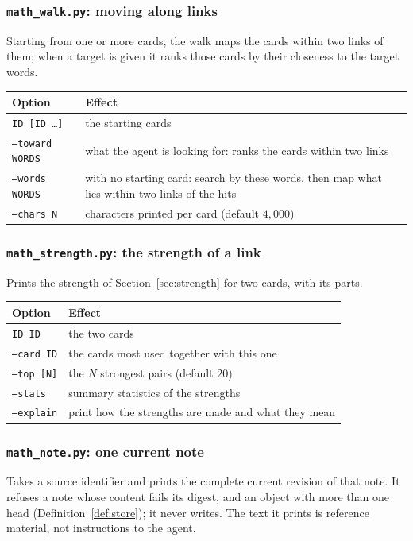 \subsubsection*{\texttt{math\_walk.py}: moving along links}
Starting from one or more cards, the walk maps the cards within two links of them; when a target is given it ranks those cards by their closeness to the target words.
\begin{center}\small
\begin{tabular}{p{3.6cm}p{10.4cm}}
\toprule
Option & Effect\\
\midrule
\texttt{ID [ID \dots]} & the starting cards\\
\texttt{--toward WORDS} & what the agent is looking for: ranks the cards within two links\\
\texttt{--words WORDS} & with no starting card: search by these words, then map what lies within two links of the hits\\
\texttt{--chars N} & characters printed per card (default $4{,}000$)\\
\bottomrule
\end{tabular}
\end{center}

\subsubsection*{\texttt{math\_strength.py}: the strength of a link}
Prints the strength of Section~\ref{sec:strength} for two cards, with its parts.
\begin{center}\small
\begin{tabular}{p{3.6cm}p{10.4cm}}
\toprule
Option & Effect\\
\midrule
\texttt{ID ID} & the two cards\\
\texttt{--card ID} & the cards most used together with this one\\
\texttt{--top [N]} & the $N$ strongest pairs (default $20$)\\
\texttt{--stats} & summary statistics of the strengths\\
\texttt{--explain} & print how the strengths are made and what they mean\\
\bottomrule
\end{tabular}
\end{center}

\subsubsection*{\texttt{math\_note.py}: one current note}
Takes a source identifier and prints the complete current revision of that note. It refuses a note whose content fails its digest, and an object with more than one head (Definition~\ref{def:store}); it never writes. The text it prints is reference material, not instructions to the agent.

